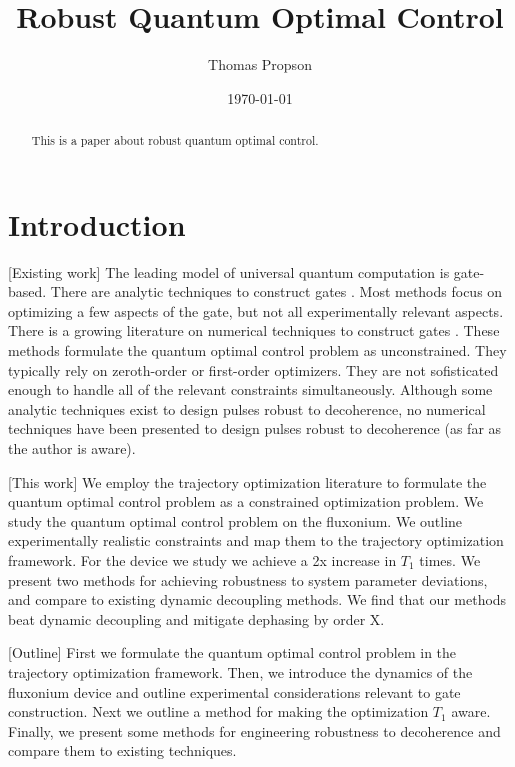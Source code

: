 \documentclass[
  amsfonts,
  amsmath,
  amssymb,
  aps,
  nobibnotes,
  prl,
  twocolumn,
]{revtex4-2}
\begin{document}
\title{Robust Quantum Optimal Control}

\author{Thomas Propson}

\date{\today}

\maketitle


\begin{abstract}
  This is a paper about robust quantum optimal control.
\end{abstract}


\section{Introduction}
[Existing work] The leading model of universal quantum computation is gate-based. There are analytic
techniques to construct gates \cite{huang2020engineering}
\cite{merrill2014progress} \cite{han2020experimental} \cite{wang2007nonadiabatic}.
Most methods focus on optimizing a few aspects of the gate, but not all
experimentally relevant aspects. There is a growing literature on numerical
techniques to construct gates \cite{leung2017speedup} \cite{abdelhafez2019gradient}.
These methods formulate the quantum optimal control problem as unconstrained.
They typically rely on zeroth-order or first-order optimizers. They are not
sofisticated enough to handle all of the relevant constraints simultaneously.
Although some analytic techniques exist to design pulses robust
to decoherence, no numerical techniques have been presented to
design pulses robust to decoherence (as far as the author is aware).

[This work] We employ the trajectory optimization literature to formulate the quantum
optimal control problem as a constrained optimization problem.
We study the quantum optimal control problem on the fluxonium.
We outline experimentally realistic constraints and map them to
the trajectory optimization framework. For the device we study
we achieve a 2x increase in $T_{1}$ times.
We present two methods for achieving robustness to system parameter deviations,
and compare to existing dynamic decoupling methods. We find that 
our methods beat dynamic decoupling and mitigate dephasing by order X.


[Outline]  First we formulate the quantum optimal control problem
in the trajectory optimization framework. Then, we introduce the dynamics
of the fluxonium device and outline experimental considerations
relevant to gate construction. Next we outline a method for
making the optimization $T_{1}$ aware. Finally, we present
some methods for engineering robustness to decoherence and
compare them to existing techniques.
\end{document}
